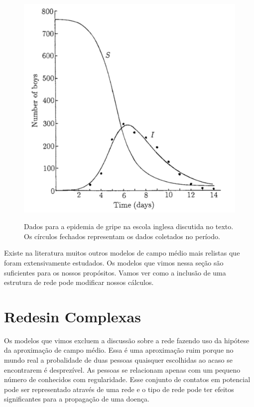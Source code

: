 \documentclass[a4paper,11pt]{report}
\begin{document}
\begin{figure}[ht!]
\begin{center}
\includegraphics[scale=0.3]{./images/school-plague}
\label{fig:escola}
\caption{Dados para a epidemia de gripe na escola inglesa discutida no texto. Os c\'irculos fechados representam os dados coletados no per\'iodo.}
\end{center}
\end{figure}

Existe na literatura muitos outros modelos de campo m\'edio mais relistas que foram extensivamente estudados. Os modelos que vimos nessa se\c{c}\~ao  s\~ao suficientes para os nossos prop\'ositos. Vamos ver como a inclus\~ao de uma estrutura de rede pode modificar nossos c\'alculos.

\section{Redesin Complexas}
\label{sec:networks}

Os modelos que vimos excluem a discuss\~ao sobre a rede fazendo uso da hip\'otese da aproxima\c{c}\~ao de campo m\'edio. Essa \'e uma aproxima\c{c}\~ao ruim porque no mundo real a probalidade de duas pessoas quaisquer escolhidas ao acaso se encontrarem \'e desprez\'ivel. As pessoas se relacionam apenas com um pequeno n\'umero de conhecidos com regularidade. Esse conjunto de contatos em potencial pode ser representado atrav\'es de uma rede e o tipo de rede pode ter efeitos significantes para a propaga\c{c}\~ao de uma doen\c{c}a. 
\end{document}
